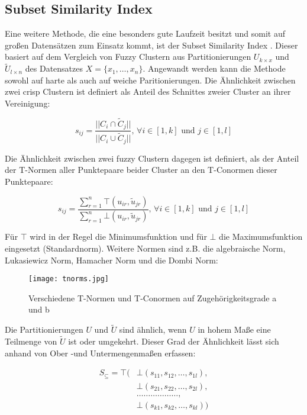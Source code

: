 \documentclass[11pt,ceqn]{book}
\begin{document}
\subsection{Subset Similarity Index}
Eine weitere Methode, die eine besonders gute Laufzeit besitzt und somit auf großen Datensätzen zum Einsatz kommt, ist der Subset Similarity Index \cite{subsim}. Dieser basiert auf dem Vergleich von Fuzzy Clustern aus Partitionierungen $U_{k\times x}$ und $\tilde{U}_{l\times n}$ des Datensatzes $X=\{x_1,\dots,x_n\}$. Angewandt werden kann die Methode sowohl auf harte als auch auf weiche Paritionierungen. Die Ähnlichkeit zwischen zwei crisp Clustern ist definiert als Anteil des Schnittes zweier Cluster an ihrer Vereinigung:

$$s_{ij} = \frac{||C_i \cap \tilde{C}_j||}{||C_i \cup \tilde{C}_j||},  \, \forall i \in \left[1,k\right]\text{ und } j \in \left[1,l\right] $$

Die Ähnlichkeit zwischen zwei fuzzy Clustern dagegen ist definiert, als der Anteil der T-Normen aller Punktepaare beider Cluster an den T-Conormen dieser Punktepaare:

$$s_{ij} = \frac{\sum\limits_{r=1}^n \top(u_{ir},\tilde{u}_{jr})}{\sum\limits_{r=1}^n \bot (u_{ir},\tilde{u}_{jr})},\, \forall i \in \left[1,k\right]\text{ und } j \in \left[1,l\right]$$

Für $\top$ wird in der Regel die Minimumsfunktion und für $\bot$ die Maximumsfunktion eingesetzt (Standardnorm). Weitere Normen sind z.B. die algebraische Norm, Lukasiewicz Norm, Hamacher Norm und die Dombi Norm:

\begin{figure}[H]
\centering
\texttt{[image: tnorms.jpg]}
\caption{Verschiedene T-Normen und T-Conormen auf Zugehörigkeitsgrade a und b}\label{tnorms}
\end{figure}

Die Partitionierungen $U$ und $\tilde{U}$ sind ähnlich, wenn $U$ in hohem Maße eine Teilmenge von $\tilde{U}$ ist oder umgekehrt. Dieser Grad der Ähnlichkeit lässt sich anhand von Ober -und Untermengenmaßen erfassen:

\begin{align*}
S_{\subseteq} = \top( 
&\bot(s_{11},s_{12}, \dots, s_{1l}), \\
&\bot(s_{21}, s_{22}, \dots, s_{2l}),\\ 
&\dots\dots\dots\dots\dots\dots,\\ 
&\bot(s_{k1}, s_{k2}, \dots, s_{kl})
)
\end{align*}
\end{document}
